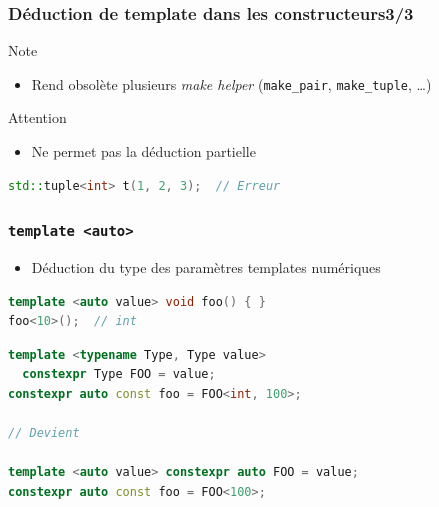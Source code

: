 \documentclass[C++.tex]{subfiles}
\begin{document}
\begin{frame}[fragile]
\frametitle{Déduction de template dans les constructeurs\titlehfill{}3/3}
	\begin{block}{Note}
		\begin{itemize}
			\item Rend obsolète plusieurs \textit{make helper} (\lstinline|make_pair|, \lstinline|make_tuple|, \ldots)
		\end{itemize}
	\end{block}

	\begin{alertblock}{Attention}
		\begin{itemize}
			\item Ne permet pas la déduction partielle
		\end{itemize}
		
		\begin{lstlisting}[language=C++]
std::tuple<int> t(1, 2, 3);  // Erreur\end{lstlisting}
	\end{alertblock}

\end{frame}

\begin{frame}[fragile]
	\frametitle{\lstinline|template <auto>|}
	\begin{itemize}
		\item Déduction du type des paramètres templates numériques
	\end{itemize}

	\begin{lstlisting}[language=C++]
template <auto value> void foo() { }
foo<10>();  // int\end{lstlisting}

	\begin{lstlisting}[language=C++]
template <typename Type, Type value> 
  constexpr Type FOO = value;
constexpr auto const foo = FOO<int, 100>;

// Devient

template <auto value> constexpr auto FOO = value;
constexpr auto const foo = FOO<100>;
\end{lstlisting}

\end{frame}
\end{document}
